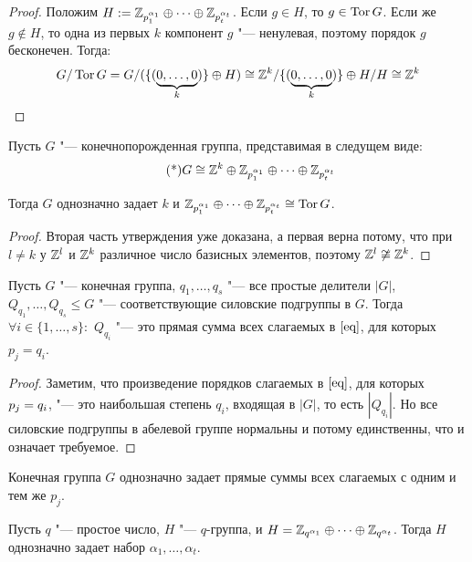 \begin{proof}
	Положим $H: = \mathbb{Z}_{p_1^{\alpha_1}} \oplus \dots \oplus \mathbb{Z}_{p_t^{\alpha_t}}$. Если $g \in H$, то $g \in \operatorname{Tor}{G}$. Если же $g \not\in H$, то одна из первых $k$ компонент $g$ "--- ненулевая, поэтому порядок $g$ бесконечен. Тогда:
	\[G / \operatorname{Tor}{G}  = G / (\{(\underbrace{0, \dotsc, 0}_{k})\} \oplus H) \cong \mathbb{Z}^k / \{(\underbrace{0, \dotsc, 0}_{k})\} \oplus H / H \cong \mathbb{Z}^k\]
\end{proof}

\begin{corollary}
	Пусть $G$ "--- конечнопорожденная группа, представимая в следущем виде:
	\begin{equation}\tag{*}\label{eq}
		G \cong \mathbb{Z}^k \oplus \mathbb{Z}_{p_1^{\alpha_1}} \oplus \dots \oplus \mathbb{Z}_{p_t^{\alpha_t}}
	\end{equation}

	Тогда $G$ однозначно задает $k$ и $\mathbb{Z}_{p_1^{\alpha_1}} \oplus \dots \oplus \mathbb{Z}_{p_t^{\alpha_t}} \cong \operatorname{Tor}{G}$.
\end{corollary}

\begin{proof}
	Вторая часть утверждения уже доказана, а первая верна потому, что при $l \ne k$ у $\mathbb{Z}^l$ и $\mathbb{Z}^k$ различное число базисных элементов, поэтому $\mathbb{Z}^l \not\cong \mathbb{Z}^k$.
\end{proof}
\begin{proposition}
	Пусть $G$ "--- конечная группа, $q_1, \dotsc, q_s$ "--- все простые делители $|G|$, $Q_{q_1}, \dotsc, Q_{q_s} \le G$ "--- соответствующие силовские подгруппы в $G$. Тогда $\forall i \in \{1, \dotsc, s\}:$ $Q_{q_i}$ "--- это прямая сумма всех слагаемых в $\eqref*{eq}$, для которых $p_j = q_i$.
\end{proposition}

\begin{proof}
	Заметим, что произведение порядков слагаемых в $\eqref*{eq}$, для которых $p_j \hm= q_i$, "--- это наибольшая степень $q_i$, входящая в $|G|$, то есть $|Q_{q_i}|$. Но все силовские подгруппы в абелевой группе нормальны и потому единственны, что и означает требуемое.
\end{proof}

\begin{corollary}
	Конечная группа $G$ однозначно задает прямые суммы всех слагаемых с одним и тем же $p_j$.
\end{corollary}

\begin{proposition}
	Пусть $q$ "--- простое число, $H$ "--- $q$-группа, и $H = \mathbb{Z}_{q^{\alpha_1}} \oplus \dotsb \oplus \mathbb{Z}_{q^{\alpha_t}}$. Тогда $H$ однозначно задает набор $\alpha_1, \dotsc, \alpha_t$.
\end{proposition}

